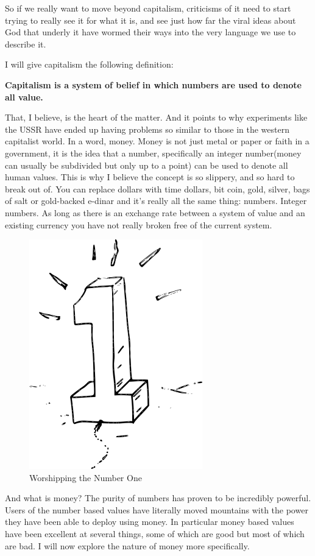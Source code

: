 So if we really want to move beyond capitalism, criticisms of it need to
start trying to really see it for what it is, and see just how far the
viral ideas about God that underly it have wormed their ways into the
very language we use to describe it.

I will give capitalism the following definition:

\textbf{Capitalism is a system of belief in which numbers are used to
denote all value.}

That, I believe, is the heart of the matter. And it points to why
experiments like the USSR have ended up having problems so similar to
those in the western capitalist world. In a word, money. Money is not
just metal or paper or faith in a government, it is the idea that a
number, specifically an integer number(money can usually be subdivided
but only up to a point) can be used to denote all human values. This is
why I believe the concept is so slippery, and so hard to break out of.
You can replace dollars with time dollars, bit coin, gold, silver, bags
of salt or gold-backed e-dinar and it's really all the same thing:
numbers. Integer numbers. As long as there is an exchange rate between a
system of value and an existing currency you have not really broken free
of the current system.

\begin{figure}[htbp]
\centering
\includegraphics{images/bigone.png}
\caption{Worshipping the Number One}
\end{figure}

And what is money? The purity of numbers has proven to be incredibly
powerful. Users of the number based values have literally moved
mountains with the power they have been able to deploy using money. In
particular money based values have been excellent at several things,
some of which are good but most of which are bad. I will now explore the
nature of money more specifically.

